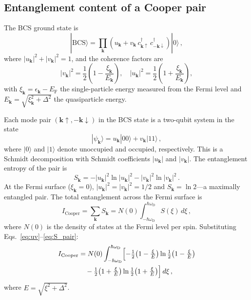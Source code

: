 \documentclass[prb,twocolumn,superscriptaddress,longbibliography,floatfix]{revtex4-2}
\newcommand{\ket}[1]{|#1\rangle}
\newcommand{\Icoop}{I_{\mathrm{Cooper}}}
\newcommand{\oD}{\omega_{\mathrm{D}}}
\newcommand{\EF}{E_{\mathrm{F}}}
\newcommand{\Ek}{E_{\bm{k}}}
\newcommand{\xik}{\xi_{\bm{k}}}
\begin{document}
\subsection{Entanglement content of a Cooper pair}

The BCS ground state is~\cite{BCS1957}
\begin{equation}\label{eq:bcs_gs}
  \ket{\mathrm{BCS}} = \prod_{\bm{k}}
  \left(u_{\bm{k}} + v_{\bm{k}}\,
  c_{\bm{k}\uparrow}^\dagger\,
  c_{-\bm{k}\downarrow}^\dagger\right)
  \ket{0}\,,
\end{equation}
where $|u_{\bm{k}}|^2 + |v_{\bm{k}}|^2 = 1$, and the coherence
factors are
\begin{equation}\label{eq:uv}
  |v_{\bm{k}}|^2 = \frac{1}{2}\left(1 - \frac{\xik}{\Ek}\right),
  \quad
  |u_{\bm{k}}|^2 = \frac{1}{2}\left(1 + \frac{\xik}{\Ek}\right),
\end{equation}
with $\xik = \epsilon_{\bm{k}} - \EF$ the single-particle energy
measured from the Fermi level and
$\Ek = \sqrt{\xik^2 + \Delta^2}$ the quasiparticle energy.

Each mode pair $(\bm{k}\!\uparrow, -\bm{k}\!\downarrow)$ in the BCS
state is a two-qubit system in the state
\begin{equation}\label{eq:pair_state}
  \ket{\psi_{\bm{k}}} = u_{\bm{k}}\ket{00}
  + v_{\bm{k}}\ket{11}\,,
\end{equation}
where $\ket{0}$ and $\ket{1}$ denote unoccupied and occupied,
respectively.  This is a Schmidt decomposition with Schmidt
coefficients $|u_{\bm{k}}|$ and $|v_{\bm{k}}|$.  The entanglement
entropy of the pair is
\begin{equation}\label{eq:S_pair}
  S_{\bm{k}} = -|u_{\bm{k}}|^2 \ln |u_{\bm{k}}|^2
  - |v_{\bm{k}}|^2 \ln |v_{\bm{k}}|^2\,.
\end{equation}
At the Fermi surface ($\xik = 0$),
$|u_{\bm{k}}|^2 = |v_{\bm{k}}|^2 = 1/2$ and
$S_{\bm{k}} = \ln 2$---a maximally entangled pair.  The total
entanglement across the Fermi surface is
\begin{equation}\label{eq:I_total}
  \Icoop = \sum_{\bm{k}} S_{\bm{k}}
  = N(0) \int_{-\hbar\oD}^{\hbar\oD}
  S(\xi)\, d\xi\,,
\end{equation}
where $N(0)$ is the density of states at the Fermi level per spin.
Substituting Eqs.~\eqref{eq:uv}--\eqref{eq:S_pair}:
\begin{align}\label{eq:I_integral}
  \Icoop &= N(0) \int_{-\hbar\oD}^{\hbar\oD}
  \Bigl[-\tfrac{1}{2}\bigl(1-\tfrac{\xi}{E}\bigr)
  \ln\tfrac{1}{2}\bigl(1-\tfrac{\xi}{E}\bigr) \nonumber\\
  &\quad -\tfrac{1}{2}\bigl(1+\tfrac{\xi}{E}\bigr)
  \ln\tfrac{1}{2}\bigl(1+\tfrac{\xi}{E}\bigr)\Bigr]\, d\xi\,,
\end{align}
where $E = \sqrt{\xi^2 + \Delta^2}$.
\end{document}

